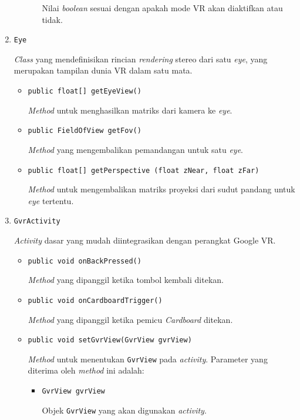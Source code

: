 \begin{enumerate}
\begin{itemize}
\begin{itemize}
					Nilai \textit{boolean} sesuai dengan apakah mode VR akan diaktifkan atau tidak.
				\end{itemize}
			
			\end{itemize}				
		
		\item \texttt{Eye}
		
		\textit{Class} yang mendefinisikan rincian \textit{rendering} stereo dari satu \textit{eye}, yang merupakan tampilan dunia VR dalam satu mata. 
			\begin{itemize}
				\item \texttt{public float[] getEyeView()}
				
				\textit{Method} untuk menghasilkan matriks dari kamera ke \textit{eye}.
				\item \texttt{public FieldOfView getFov()}
				
				\textit{Method} yang mengembalikan pemandangan untuk satu \textit{eye}.
				\item \texttt{public float[] getPerspective (float zNear, float zFar)}
				
				\textit{Method} untuk mengembalikan matriks proyeksi dari sudut pandang untuk \textit{eye} tertentu.
			\end{itemize}
		
		\item \texttt{GvrActivity}
		
		\textit{Activity} dasar yang mudah diintegrasikan dengan perangkat Google VR. 
			\begin{itemize}
				\item \texttt{public void onBackPressed()}
				
				\textit{Method} yang dipanggil ketika tombol kembali ditekan.
				\item \texttt{public void onCardboardTrigger()}
				
				\textit{Method} yang dipanggil ketika pemicu \textit{Cardboard} ditekan.
				\item \texttt{public void setGvrView(GvrView gvrView)}
				
				\textit{Method} untuk menentukan \texttt{GvrView} pada \textit{activity}. Parameter yang diterima oleh \textit{method} ini adalah:
				
				\begin{itemize}
					\item \texttt{GvrView gvrView}
					
					Objek \texttt{GvrView} yang akan digunakan \textit{activity}.
				\end{itemize}			
			\end{itemize}	 
		

\end{enumerate}
